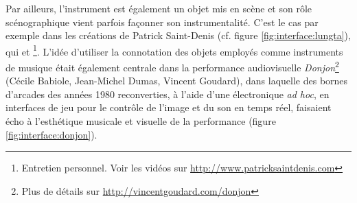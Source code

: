 \indent Par ailleurs, l'instrument est également un objet mis en scène et son rôle scénographique vient parfois façonner son instrumentalité. C'est le cas par exemple dans les créations de Patrick Saint-Denis (cf. figure \ref{fig:interface:lungta}), qui  et \footnote{Entretien personnel. Voir les vidéos sur \url{http://www.patricksaintdenis.com}}. L'idée d'utiliser la connotation des objets employés comme instruments de musique était également centrale dans la performance audiovisuelle \textit{Donjon}\footnote{Plus de détails sur \url{http://vincentgoudard.com/donjon}} (Cécile Babiole, Jean-Michel Dumas, Vincent Goudard), dans laquelle des bornes d'arcades des années 1980 reconverties, à l'aide d'une électronique \textit{ad hoc}, en interfaces de jeu pour le contrôle de l'image et du son en temps réel, faisaient écho à l'esthétique musicale et visuelle de la performance (figure \ref{fig:interface:donjon}).\\
